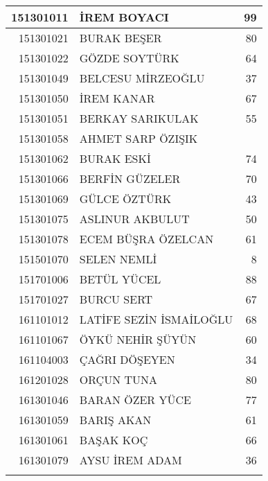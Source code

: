 \documentclass[12pt]{article}
\begin{document}
\begin{multicols}{2}
\begin{longtable}{||r||l||r||}
    \midrule
    151301011 & İREM BOYACI & 99 \\
    \midrule
    151301021 & BURAK BEŞER & 80 \\
    \midrule
    151301022 & GÖZDE SOYTÜRK & 64 \\
    \midrule
    151301049 & BELCESU MİRZEOĞLU & 37 \\
    \midrule
    151301050 & İREM KANAR & 67 \\
    \midrule
    151301051 & BERKAY SARIKULAK & 55 \\
    \midrule
    151301058 & AHMET SARP ÖZIŞIK &  \\
    \midrule
    151301062 & BURAK ESKİ & 74 \\
    \midrule
    151301066 & BERFİN GÜZELER & 70 \\
    \midrule
    151301069 & GÜLCE ÖZTÜRK & 43 \\
    \midrule
    151301075 & ASLINUR AKBULUT & 50 \\
    \midrule
    151301078 & ECEM BÜŞRA ÖZELCAN & 61 \\
    \midrule
    151501070 & SELEN NEMLİ & 8 \\
    \midrule
    151701006 & BETÜL YÜCEL & 88 \\
    \midrule
    151701027 & BURCU SERT & \cellcolor[rgb]{ 1,  1,  0} 67 \\
    \midrule
    161101012 & LATİFE SEZİN İSMAİLOĞLU & 68 \\
    \midrule
    161101067 & ÖYKÜ NEHİR ŞÜYÜN & 60 \\
    \midrule
    161104003 & ÇAĞRI DÖŞEYEN & 34 \\
    \midrule
    161201028 & ORÇUN TUNA & 80 \\
    \midrule
    161301046 & BARAN ÖZER YÜCE & \cellcolor[rgb]{ 1,  1,  0} 77 \\
    \midrule
    161301059 & BARIŞ AKAN & 61 \\
    \midrule
    161301061 & BAŞAK KOÇ & 66 \\
    \midrule
    161301079 & AYSU İREM ADAM & 36 \\
    \bottomrule
    \bottomrule  \label{tab:addlabel}%
    \end{longtable}%

\end{multicols}
\end{document}
